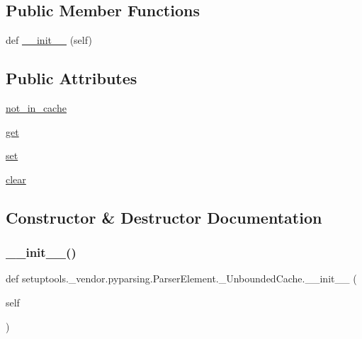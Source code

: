 \subsection*{Public Member Functions}
\begin{DoxyCompactItemize}
\item 
def \hyperlink{classsetuptools_1_1__vendor_1_1pyparsing_1_1ParserElement_1_1__UnboundedCache_a3c25d2c88540d22cc403871ab7ea147f}{\+\_\+\+\_\+init\+\_\+\+\_\+} (self)
\end{DoxyCompactItemize}
\subsection*{Public Attributes}
\begin{DoxyCompactItemize}
\item 
\hyperlink{classsetuptools_1_1__vendor_1_1pyparsing_1_1ParserElement_1_1__UnboundedCache_a7a93c8a49b63eef19154d4477c666fd1}{not\+\_\+in\+\_\+cache}
\item 
\hyperlink{classsetuptools_1_1__vendor_1_1pyparsing_1_1ParserElement_1_1__UnboundedCache_a324eb208529eff63ace99f997a97e978}{get}
\item 
\hyperlink{classsetuptools_1_1__vendor_1_1pyparsing_1_1ParserElement_1_1__UnboundedCache_a496b36f48ec38f887e2285686354d4f5}{set}
\item 
\hyperlink{classsetuptools_1_1__vendor_1_1pyparsing_1_1ParserElement_1_1__UnboundedCache_a89c1b2d6c3e9e3ff16261610bc1dd2d6}{clear}
\end{DoxyCompactItemize}


\subsection{Constructor \& Destructor Documentation}
\mbox{\label{classsetuptools_1_1__vendor_1_1pyparsing_1_1ParserElement_1_1__UnboundedCache_a3c25d2c88540d22cc403871ab7ea147f}} 
\subsubsection{\texorpdfstring{\+\_\+\+\_\+init\+\_\+\+\_\+()}{\_\_init\_\_()}}
{\footnotesize\ttfamily def setuptools.\+\_\+vendor.\+pyparsing.\+Parser\+Element.\+\_\+\+Unbounded\+Cache.\+\_\+\+\_\+init\+\_\+\+\_\+ (\begin{DoxyParamCaption}\item[{}]{self }\end{DoxyParamCaption})}



